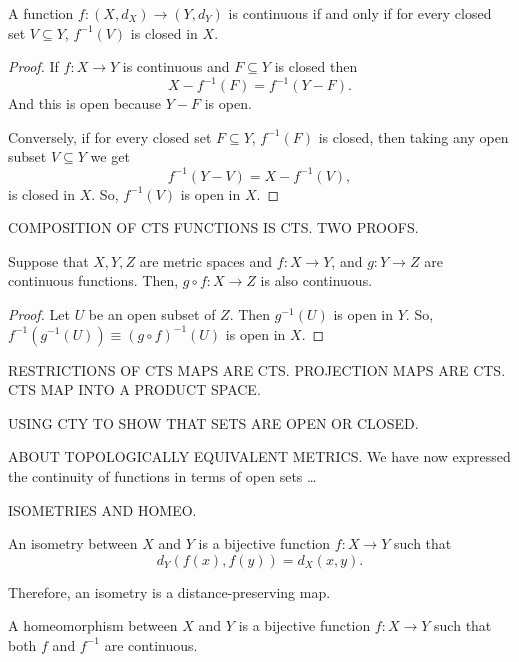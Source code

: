 \documentclass[draft]{penrose}
\begin{document}
\begin{ncor}
  A function $f:(X, d_X) \to (Y, d_Y)$ is continuous if and only if for every closed set $V \subseteq Y$, $f^{-1}(V)$ is closed in $X$.
\end{ncor}
\begin{proof}
  If $f:X \to Y$ is continuous and $F \subseteq Y$ is closed then
  \begin{equation*}
    X - f^{-1}(F) = f^{-1}(Y-F).
  \end{equation*}
  And this is open because $Y-F$ is open.

  Conversely, if for every closed set $F \subseteq Y$, $f^{-1}(F)$ is closed, then taking any open subset $V \subseteq Y$ we get
  \begin{equation*}
    f^{-1}(Y-V)=X-f^{-1}(V),
  \end{equation*}
  is closed in $X$. So, $f^{-1}(V)$ is open in $X$.
\end{proof}

COMPOSITION OF CTS FUNCTIONS IS CTS. TWO PROOFS.

\begin{nprop}
  Suppose that $X, Y, Z$ are metric spaces and $f:X \to Y$, and $g:Y \to Z$ are continuous functions. Then, $g \circ f: X \to Z$ is also continuous.
\end{nprop}
\begin{proof}
  Let $U$ be an open subset of $Z$. Then $g^{-1}(U)$ is open in $Y$. So, $f^{-1}(g^{-1}(U)) \equiv (g \circ f)^{-1}(U)$ is open in $X$.
\end{proof}

RESTRICTIONS OF CTS MAPS ARE CTS. PROJECTION MAPS ARE CTS. CTS MAP INTO A PRODUCT SPACE.

USING CTY TO SHOW THAT SETS ARE OPEN OR CLOSED.

ABOUT TOPOLOGICALLY EQUIVALENT METRICS.
We have now expressed the continuity of functions in terms of open sets \dots

ISOMETRIES AND HOMEO.

\begin{ndfn}[Isometry]
  An isometry between $X$ and $Y$ is a bijective function $f:X \to Y$ such that
  \begin{equation*}
    d_{Y}(f(x), f(y)) = d_{X}(x, y).
  \end{equation*}
\end{ndfn}
Therefore, an isometry is a distance-preserving map.

\begin{ndfn}[Homeomorphism]
  A homeomorphism between $X$ and $Y$ is a bijective function $f:X \to Y$ such that both $f$ and $f^{-1}$ are continuous.
\end{ndfn}
\end{document}
